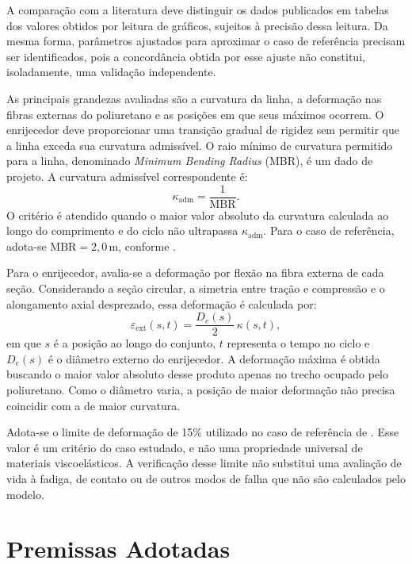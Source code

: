 \documentclass[arial,centeredequations,english,brazilian,oneside,section=TITLE]{ifes8}
\begin{document}
A comparação com a literatura deve distinguir os dados publicados em tabelas dos valores
obtidos por leitura de gráficos, sujeitos à precisão dessa leitura. Da mesma forma, parâmetros
ajustados para aproximar o caso de referência precisam ser identificados, pois a concordância
obtida por esse ajuste não constitui, isoladamente, uma validação independente.

As principais grandezas avaliadas são a curvatura da linha, a deformação nas fibras externas
do poliuretano e as posições em que seus máximos ocorrem. O enrijecedor deve proporcionar
uma transição gradual de rigidez sem permitir que a linha exceda sua curvatura admissível.
O raio mínimo de curvatura permitido para a linha, denominado \emph{Minimum Bending Radius}
(MBR), é um dado de projeto. A curvatura admissível correspondente é:
\begin{equation}
\label{eq:mbr}
\kappa_\text{adm} = \frac{1}{\text{MBR}}.
\end{equation}
O critério é atendido quando o maior valor absoluto da curvatura calculada ao longo do
comprimento e do ciclo não ultrapassa $\kappa_\text{adm}$. Para o caso de referência,
adota-se $\text{MBR}=2{,}0\,\mathrm{m}$, conforme .

Para o enrijecedor, avalia-se a deformação por flexão na fibra externa de cada seção.
Considerando a seção circular, a simetria entre tração e compressão e o alongamento axial
desprezado, essa deformação é calculada por:
\begin{equation}
\label{eq:deformacao-maxima}
\varepsilon_\text{ext}(s,t) = \frac{D_e(s)}{2}\,\kappa(s,t),
\end{equation}
em que $s$ é a posição ao longo do conjunto, $t$ representa o tempo no ciclo e $D_e(s)$
é o diâmetro externo do enrijecedor. A deformação máxima é obtida buscando o maior valor
absoluto desse produto apenas no trecho ocupado pelo poliuretano. Como o diâmetro varia,
a posição de maior deformação não precisa coincidir com a de maior curvatura.

Adota-se o limite de deformação de 15\% utilizado no caso de referência de
. Esse valor é um critério do caso estudado, e não
uma propriedade universal de materiais viscoelásticos. A verificação desse limite não
substitui uma avaliação de vida à fadiga, de contato ou de outros modos de falha que não
são calculados pelo modelo.

\section{Premissas Adotadas}
\label{sec:premissas-adotadas}
\end{document}
